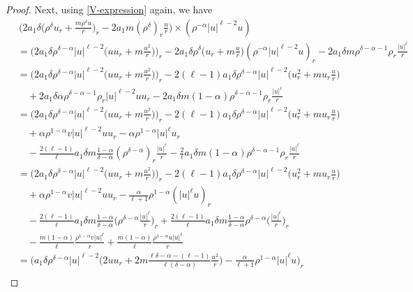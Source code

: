 \documentclass[11pt,reqno]{amsart}
\numberwithin{rk}{section}
\numberwithin{prop}{section}
\numberwithin{mydef}{section}
\numberwithin{lem}{section}
\numberwithin{equation}{section}
\numberwithin{thm}{section}
\begin{document}
\begin{proof}
Next, using \eqref{V-expression} again, we have
\begin{align*}
&\,\Big(2a_1\delta \big(\rho^\delta u_r+\frac{m\rho^\delta u}{r}\big)_r-2a_1m(\rho^\delta)_r\frac{u}{r}\Big)\times (\rho^{-\alpha}|u|^{\ell-2}u)\\
&= \Big(2a_1\delta \rho^{\delta-\alpha} |u|^{\ell-2}\big(uu_r+m \frac{u^2}{r}\big)\Big)_r-2a_1\delta \rho^\delta \big(u_r+m\frac{u}{r}\big)(\rho^{-\alpha}|u|^{\ell-2}u)_r-2a_1\delta m\rho^{\delta-\alpha-1}\rho_r\frac{|u|^\ell}{r}\\
&= \Big(2a_1\delta \rho^{\delta-\alpha} |u|^{\ell-2}\big(uu_r+m \frac{u^2}{r}\big)\Big)_r-2(\ell-1)a_1\delta \rho^{\delta-\alpha}|u|^{\ell-2}\big(u_r^2+m u_r\frac{u}{r}\big) \\
&\quad+2a_1\delta\alpha \rho^{\delta-\alpha-1}\rho_r |u|^{\ell-2}uu_r -2a_1\delta m(1-\alpha) \rho^{\delta-\alpha-1}\rho_r \frac{|u|^\ell}{r}\\
&=\Big(2a_1\delta \rho^{\delta-\alpha} |u|^{\ell-2}\big(uu_r+m \frac{u^2}{r}\big)\Big)_r-2(\ell-1)a_1\delta \rho^{\delta-\alpha}|u|^{\ell-2}\big(u_r^2+m u_r\frac{u}{r}\big) \\
&\quad+ \alpha \rho^{1-\alpha}v |u|^{\ell-2}uu_r-\alpha \rho^{1-\alpha}|u|^{\ell} u_r\\
&\quad  - \frac{2(\ell-1)}{\ell}a_1\delta m\frac{1-\alpha}{\delta-\alpha} (\rho^{\delta-\alpha})_r \frac{|u|^\ell}{r}- \frac{2}{\ell}a_1\delta m(1-\alpha)\rho^{\delta-\alpha-1}\rho_r \frac{|u|^\ell}{r}\\
&=\Big(2a_1\delta \rho^{\delta-\alpha} |u|^{\ell-2}\big(uu_r+m \frac{u^2}{r}\big)\Big)_r-2(\ell-1)a_1\delta \rho^{\delta-\alpha}|u|^{\ell-2}\big(u_r^2+m u_r\frac{u}{r}\big) \\
&\quad+ \alpha \rho^{1-\alpha}v |u|^{\ell-2} uu_r-\frac{\alpha}{\ell+1} \rho^{1-\alpha}(|u|^{\ell}u)_r\\
&\quad - \frac{2(\ell-1)}{\ell} a_1\delta m\frac{1-\alpha}{\delta-\alpha} \Big(\rho^{\delta-\alpha}\frac{|u|^\ell}{r}\Big)_r +  \frac{2(\ell-1)}{\ell} a_1\delta m\frac{1-\alpha}{\delta-\alpha} \rho^{\delta-\alpha} \big(\frac{|u|^\ell}{r}\big)_r\\
&\quad - \frac{m(1-\alpha)}{\ell}\frac{\rho^{1-\alpha}v|u|^\ell}{r}+ \frac{m(1-\alpha)}{\ell}\frac{\rho^{1-\alpha}u|u|^\ell}{r}\\
&= \Big( a_1\delta \rho^{\delta-\alpha} |u|^{\ell-2}\big(2uu_r+ 2m \frac{\ell\delta-\alpha-(\ell-1)}{\ell(\delta-\alpha)} \frac{u^2}{r}\big)-\frac{\alpha}{\ell+1}  \rho^{1-\alpha}|u|^\ell u\Big)_r\\

\end{align*}
\end{proof}
\end{document}

